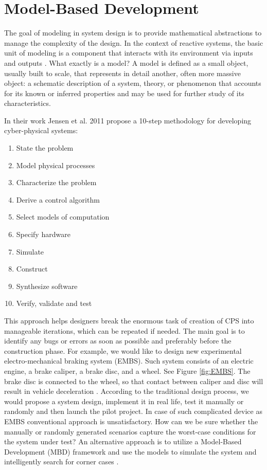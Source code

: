 \section{Model-Based Development}

The goal of modeling in system design is to provide mathematical abstractions to manage the complexity of the design. In the context of reactive systems, the basic unit of modeling is a component that interacts with its environment via inputs and outputs \cite{Rajeev:PrinciplesCPS}. What exactly is a model? A model is defined as a small object, usually built to scale, that represents in detail another, often more massive object: a schematic description of a system, theory, or phenomenon that accounts for its known or inferred properties and may be used for further study of its characteristics.

In their work Jensen et al. 2011 \cite{Lee:MBD} propose a 10-step methodology for developing cyber-physical systems:

\begin{enumerate}
    \item State the problem
    \item Model physical processes
    \item Characterize the problem
    \item Derive a control algorithm
    \item Select models of computation
    \item Specify hardware
    \item Simulate
    \item Construct
    \item Synthesize software
    \item Verify, validate and test
\end{enumerate}

This approach helps designers break the enormous task of creation of CPS into manageable iterations, which can be repeated if needed. The main goal is to identify any bugs or errors as soon as possible and preferably before the construction phase. For example, we would like to design new experimental electro-mechanical braking system (EMBS). Such system consists of an electric engine, a brake caliper, a brake disc, and a wheel. See Figure \ref{fig:EMBS}. The brake disc is connected to the wheel, so that contact between caliper and disc will result in vehicle deceleration \cite{Oehlerking:EMBS}. According to the traditional design process, we would propose a system design, implement it in real life, test it manually or randomly and then launch the pilot project. In case of such complicated device as EMBS conventional approach is unsatisfactory. How can we be sure whether the manually or randomly generated scenarios capture the worst-case conditions for the system under test? An alternative approach is to utilize a Model-Based Development (MBD) framework and use the models to simulate the system and intelligently search for corner cases \cite{Fainekos:testCaseGeneration}.

